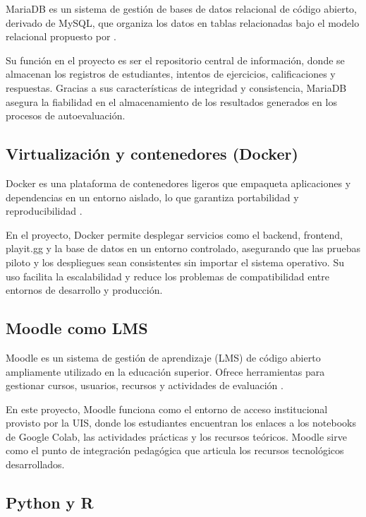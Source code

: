 \documentclass[letter,oneside,12pt,spanish]{report}
\begin{document}
MariaDB es un sistema de gestión de bases de datos relacional de código abierto, derivado de MySQL, que organiza los datos en tablas relacionadas bajo el modelo relacional propuesto por \textcite{codd1970}.

Su función en el proyecto es ser el repositorio central de información, donde se almacenan los registros de estudiantes, intentos de ejercicios, calificaciones y respuestas. Gracias a sus características de integridad y consistencia, MariaDB asegura la fiabilidad en el almacenamiento de los resultados generados en los procesos de autoevaluación.

\subsection{Virtualización y contenedores (Docker)}

Docker es una plataforma de contenedores ligeros que empaqueta aplicaciones y dependencias en un entorno aislado, lo que garantiza portabilidad y reproducibilidad \parencite{merkel2014}.

En el proyecto, Docker permite desplegar servicios como el backend, frontend, playit.gg y la base de datos en un entorno controlado, asegurando que las pruebas piloto y los despliegues sean consistentes sin importar el sistema operativo. Su uso facilita la escalabilidad y reduce los problemas de compatibilidad entre entornos de desarrollo y producción.

\subsection{Moodle como LMS}

Moodle es un sistema de gestión de aprendizaje (LMS) de código abierto ampliamente utilizado en la educación superior. Ofrece herramientas para gestionar cursos, usuarios, recursos y actividades de evaluación \parencite{dougiamas2003}.

En este proyecto, Moodle funciona como el entorno de acceso institucional provisto por la UIS, donde los estudiantes encuentran los enlaces a los notebooks de Google Colab, las actividades prácticas y los recursos teóricos. Moodle sirve como el punto de integración pedagógica que articula los recursos tecnológicos desarrollados.

\subsection{Python y R}
\end{document}
